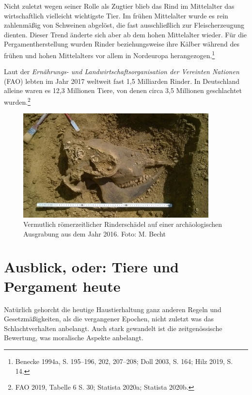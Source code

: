 \documentclass[a4paper,
fontsize=11pt,
oneside,
numbers=noperiodatend,
parskip=half-,
bibliography=totoc,
final
]{scrartcl}
\begin{document}
Nicht zuletzt wegen seiner Rolle als Zugtier blieb das Rind im
Mittelalter das wirtschaftlich vielleicht wichtigste Tier. Im frühen
Mittelalter wurde es rein zahlenmäßig von Schweinen abgelöst, die fast
ausschließlich zur Fleischerzeugung dienten. Dieser Trend änderte sich
aber ab dem hohen Mittelalter wieder. Für die Pergamentherstellung
wurden Rinder beziehungsweise ihre Kälber während des frühen und hohen
Mittelalters vor allem in Nordeuropa herangezogen.\footnote{Benecke
  1994a, S. 195--196, 202, 207--208; Doll 2003, S. 164; Hilz 2019, S.
  14.}

Laut der \emph{Ernährungs- und Landwirtschaftsorganisation der Vereinten
Nationen} (FAO) lebten im Jahr 2017 weltweit fast 1,5 Milliarden Rinder.
In Deutschland alleine waren es 12,3 Millionen Tiere, von denen circa
3,5 Millionen geschlachtet wurden.\footnote{FAO 2019, Tabelle 6 S. 30;
  Statista 2020a; Statista 2020b.}

\begin{figure}[h!]
\centering
\includegraphics[width=0.9\textwidth]{img/image2.jpg}
\caption{Vermutlich römerzeitlicher Rinderschädel auf einer archäologischen Ausgrabung aus dem Jahr 2016. Foto: M. Becht}
\end{figure}

\hypertarget{ausblick-oder-tiere-und-pergament-heute}{%
\section{Ausblick, oder: Tiere und Pergament
heute}\label{ausblick-oder-tiere-und-pergament-heute}}

Natürlich gehorcht die heutige Haustierhaltung ganz anderen Regeln und
Gesetzmäßigkeiten, als die vergangener Epochen, nicht zuletzt was das
Schlachtverhalten anbelangt. Auch stark gewandelt ist die
zeitgenössische Bewertung, was moralische Aspekte anbelangt.
\end{document}
